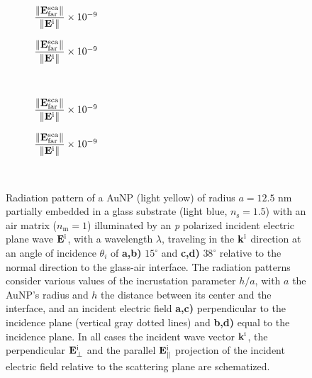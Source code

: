 \begin{figure}[h!]
    \centering
    \def\svgwidth{.8\textwidth}
    \\[-16.5em]
    \hspace*{-.2\textwidth}%
        \begin{subfigure}{.375\textwidth}\caption{%
                    \footnotesize$\dfrac{\norm{\vb{E}^\text{sca}_\text{far}}}{\norm{\vb{E}^\text{i}}} \times 10^{-9}$  }\label{sfig:Far:Inc:p1:a}\end{subfigure}%
        \begin{subfigure}{.4\textwidth}\caption{%
                    \footnotesize$\dfrac{\norm{\vb{E}^\text{sca}_\text{far}}}{\norm{\vb{E}^\text{i}}} \times 10^{-9}$  }\label{sfig:Far:Inc:p1:b}\end{subfigure}\\[13em]
    \def\svgwidth{.8\textwidth}
    \hspace*{-.21\textwidth}%
    \vspace*{-.7em}%
        \begin{subfigure}{.4\textwidth}\caption{%
                    \footnotesize$\dfrac{\norm{\vb{E}^\text{sca}_\text{far}}}{\norm{\vb{E}^\text{i}}} \times 10^{-9}$  }\label{sfig:Far:Inc:p1:c}\end{subfigure}%
        \begin{subfigure}{.4\textwidth}\caption{%
                    \footnotesize$\dfrac{\norm{\vb{E}^\text{sca}_\text{far}}}{\norm{\vb{E}^\text{i}}} \times 10^{-9}$  }\label{sfig:Far:Inc:p1:d}\end{subfigure}\\
    \caption[  Radiation pattern of a AuNP supported on a substrate illuminated at oblique incidence ]{
    Radiation pattern of a AuNP (light yellow) of radius $a = 12.5$ nm partially embedded in a glass substrate (light blue, $n_\text{s} = 1.5$) with an air matrix ($n_\text{m} = 1$) illuminated by an \textit{p} polarized incident electric plane wave $\vb{E}^\text{i}$, with a wavelength $\lambda$, traveling in the $\vb{k}^\text{i}$ direction at an angle of incidence $\theta_i$ of \textbf{a,b)} $15^\circ$ and \textbf{c,d)} $38^\circ$ relative to the normal direction to the glass-air interface. The radiation patterns consider various values of the incrustation parameter $h/a$, with $a$ the AuNP's radius and $h$ the distance between its center and the interface, and an  incident electric field \textbf{a,c)} perpendicular to the incidence plane (vertical gray dotted lines) and \textbf{b,d)} equal to the incidence plane. In all cases the incident wave vector $\vb{k}^\text{i}$, the perpendicular $\vb{E}_\perp^\text{i}$ and the  parallel $\vb{E}_\parallel^\text{i}$ projection of the incident electric field relative to the scattering plane are schematized.%
    }
    \label{fig:Far:Inc:p1}
\end{figure}

